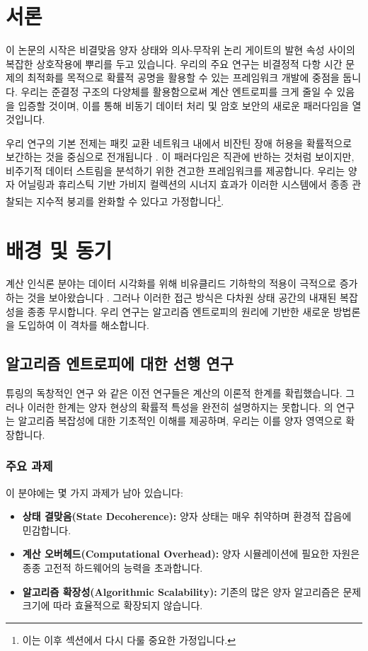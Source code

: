 
\section{서론}
이 논문의 시작은 비결맞음 양자 상태와 의사-무작위 논리 게이트의 발현 속성 사이의 복잡한 상호작용에 뿌리를 두고 있습니다. 우리의 주요 연구는 비결정적 다항 시간 문제의 최적화를 목적으로 확률적 공명을 활용할 수 있는 프레임워크 개발에 중점을 둡니다. 우리는 준결정 구조의 다양체를 활용함으로써 계산 엔트로피를 크게 줄일 수 있음을 입증할 것이며, 이를 통해 비동기 데이터 처리 및 암호 보안의 새로운 패러다임을 열 것입니다.

우리 연구의 기본 전제는 패킷 교환 네트워크 내에서 비잔틴 장애 허용을 확률적으로 보간하는 것을 중심으로 전개됩니다 \cite{knuth1997art}. 이 패러다임은 직관에 반하는 것처럼 보이지만, 비주기적 데이터 스트림을 분석하기 위한 견고한 프레임워크를 제공합니다. 우리는 양자 어닐링과 휴리스틱 기반 가비지 컬렉션의 시너지 효과가 이러한 시스템에서 종종 관찰되는 지수적 붕괴를 완화할 수 있다고 가정합니다\footnote{이는 이후 섹션에서 다시 다룰 중요한 가정입니다.}.

\section{배경 및 동기}
계산 인식론 분야는 데이터 시각화를 위해 비유클리드 기하학의 적용이 극적으로 증가하는 것을 보아왔습니다 \cite{shannon1948mathematical}. 그러나 이러한 접근 방식은 다차원 상태 공간의 내재된 복잡성을 종종 무시합니다. 우리 연구는 알고리즘 엔트로피의 원리에 기반한 새로운 방법론을 도입하여 이 격차를 해소합니다.

\subsection{알고리즘 엔트로피에 대한 선행 연구}
튜링의 독창적인 연구 \cite{turing1950computing}와 같은 이전 연구들은 계산의 이론적 한계를 확립했습니다. 그러나 이러한 한계는 양자 현상의 확률적 특성을 완전히 설명하지는 못합니다. \cite{cormen2009introduction}의 연구는 알고리즘 복잡성에 대한 기초적인 이해를 제공하며, 우리는 이를 양자 영역으로 확장합니다.

\subsubsection{주요 과제}
이 분야에는 몇 가지 과제가 남아 있습니다:
\begin{itemize}
    \item \textbf{상태 결맞음(State Decoherence):} 양자 상태는 매우 취약하며 환경적 잡음에 민감합니다.
    \item \textbf{계산 오버헤드(Computational Overhead):} 양자 시뮬레이션에 필요한 자원은 종종 고전적 하드웨어의 능력을 초과합니다.
    \item \textbf{알고리즘 확장성(Algorithmic Scalability):} 기존의 많은 양자 알고리즘은 문제 크기에 따라 효율적으로 확장되지 않습니다.
\end{itemize}


